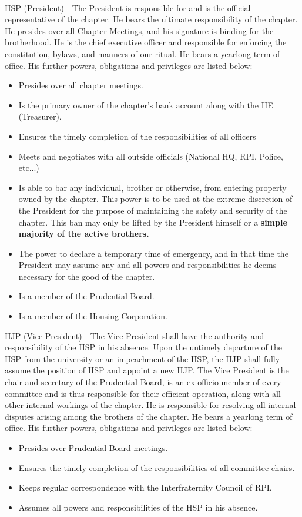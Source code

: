 \documentclass{article}
\begin{document}
\\\underline{HSP (President)} - The President is responsible for and is the official representative of the chapter. He bears the ultimate responsibility of the chapter. He presides over all Chapter Meetings, and his signature is binding for the brotherhood. He is the chief executive officer and responsible for enforcing the constitution, bylaws, and manners of our ritual. He bears a yearlong term of office. His further powers, obligations and privileges are listed below:
\begin{itemize}
    \item Presides over all chapter meetings.
    \item Is the primary owner of the chapter’s bank account along with the HE (Treasurer).
    \item Ensures the timely completion of the responsibilities of all officers
    \item Meets and negotiates with all outside officials (National HQ, RPI, Police, etc...)
    \item Is able to bar any individual, brother or otherwise, from entering property owned by the chapter. This power is to be used at the extreme discretion of the President for the purpose of maintaining the safety and security of the chapter. This ban may only be lifted by the President himself or a \textbf{simple majority of the active brothers.}
    \item The power to declare a temporary time of emergency, and in that time the President may assume any and all powers and responsibilities he deems necessary for the good of the chapter. 
    \item Is a member of the Prudential Board.
    \item Is a member of the Housing Corporation.
\end{itemize}

\underline{HJP (Vice President)} - The Vice President shall have the authority and responsibility of the HSP in his absence. Upon the untimely departure of the HSP from the university or an impeachment of the HSP, the HJP shall fully assume the position of HSP and appoint a new HJP. The Vice President is the chair and secretary of the Prudential Board, is an ex officio member of every committee and is thus responsible for their efficient operation, along with all other internal workings of the chapter. He is responsible for resolving all internal disputes arising among the brothers of the chapter. He bears a yearlong term of office. His further powers, obligations and privileges are listed below:
\begin{itemize}
    \item Presides over Prudential Board meetings.
    \item Ensures the timely completion of the responsibilities of all committee chairs.
    \item Keeps regular correspondence with the Interfraternity Council of RPI.
    \item Assumes all powers and responsibilities of the HSP in his absence.
\end{itemize}
\end{document}
